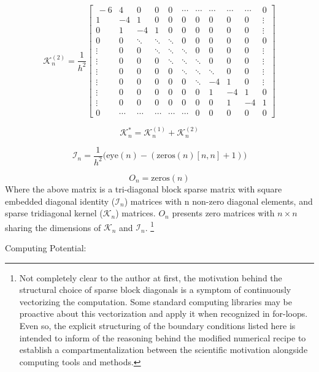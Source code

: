 \[
    \mathcal{K}_n^{(2)}  = 
\frac{1}{h^2}
\begin{bmatrix} \,
-6 & 4 & 0 & 0& 0 & \cdots & \cdots & \cdots & \cdots & \cdots & 0 \\
1 & -4 & 1 & 0 & 0 & 0 & 0 & 0 & 0 & 0 & \vdots \\
0 & 1 & -4 & 1 & 0 & 0 & 0 & 0 & 0 & 0 & \vdots \\
0 & 0 & \ddots & \ddots & \ddots & 0 & 0 & 0 & 0 & 0 & 0 \\
\vdots & 0  & 0  & \ddots & \ddots & \ddots & 0 & 0 & 0 & 0  & \vdots \\
\vdots & 0  & 0  & 0  & \ddots & \ddots & \ddots & 0 & 0 & 0 & \vdots \\
\vdots & 0  & 0  & 0 & 0 & \ddots & \ddots & \ddots & 0 & 0  & \vdots \\
\vdots & 0  & 0  & 0 & 0 & 0 & \ddots & -4 & 1 & 0  & \vdots\\
\vdots & 0  & 0  & 0 & 0 & 0 & 0 & 1 & -4  & 1 & 0\\
\vdots & 0 & 0 & 0 & 0 & 0 & 0 & 0 & 1 & -4 & 1\\
0      & \cdots & \cdots & \cdots & \cdots & \cdots & 0 & 0 & 0 & 0 & 0 
\end{bmatrix}
\]

\[
	\mathcal{K}_n^{*} = \mathcal{K}_n^{(1)} + \mathcal{K}_n^{(2)} 
\]

\[
    \mathcal{I}_n = \frac{1}{h^2} \bigg( \mathrm{eye}(n) - (\mathrm{zeros}(n)[n,n] + 1) \bigg)
\]

\[ 
	O_{n} = \mathrm{zeros}(n)
\]	
Where the above matrix is a tri-diagonal block sparse matrix with square embedded diagonal identity ($\mathcal{I}_n$) matrices with n non-zero diagonal elements, and sparse tridiagonal kernel ($\mathcal{K}_n$) matrices. $O_n$ presents zero matrices with $n\times n$ sharing the dimensions of $\mathcal{K}_n$ and $\mathcal{I}_n$. \footnote{Not completely clear to the author at first, the motivation behind the structural choice of sparse block diagonals is a symptom of continuously vectorizing the computation. Some standard computing libraries may be proactive about this vectorization and apply it when recognized in for-loops. Even so, the explicit structuring of the boundary conditions listed here is intended to inform of the reasoning behind the modified numerical recipe to establish a compartmentalization between the scientific motivation alongside computing tools and methods.}

\newpage

\noindent Computing Potential:


